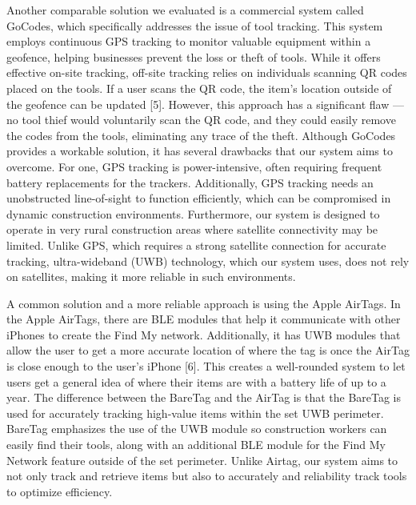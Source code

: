 \documentclass[conference]{IEEEtran}
\begin{document}
Another comparable solution we evaluated is a commercial system called 
GoCodes, which specifically addresses the issue of tool tracking. This 
system employs continuous GPS tracking to monitor valuable equipment 
within a geofence, helping businesses prevent the loss or theft of tools. 
While it offers effective on-site tracking, off-site tracking relies on 
individuals scanning QR codes placed on the tools. If a user scans the 
QR code, the item's location outside of the geofence can be updated [5]. 
However, this approach has a significant flaw — no tool thief would 
voluntarily scan the QR code, and they could easily remove the codes 
from the tools, eliminating any trace of the theft. Although GoCodes 
provides a workable solution, it has several drawbacks that our system 
aims to overcome. For one, GPS tracking is power-intensive, often requiring
frequent battery replacements for the trackers. Additionally, GPS 
tracking needs an unobstructed line-of-sight to function efficiently, 
which can be compromised in dynamic construction environments. 
Furthermore, our system is designed to operate in very rural construction 
areas where satellite connectivity may be limited. Unlike GPS, which 
requires a strong satellite connection for accurate tracking, 
ultra-wideband (UWB) technology, which our system uses, does not rely on 
satellites, making it more reliable in such environments.

A common solution and a more reliable approach is using the Apple AirTags.
In the Apple AirTags, there are BLE modules that help it communicate 
with other iPhones to create the Find My network. Additionally, it has 
UWB modules that allow the user to get a more accurate location of where 
the tag is once the AirTag is close enough to the user’s iPhone [6]. This 
creates a well-rounded system to let users get a general idea of where 
their items are with a battery life of up to a year. The difference 
between the BareTag and the AirTag is that the BareTag is used for 
accurately tracking high-value items within the set UWB perimeter. 
BareTag emphasizes the use of the UWB module so construction workers 
can easily find their tools, along with an additional BLE module for 
the Find My Network feature outside of the set perimeter. Unlike Airtag, 
our system aims to not only track and retrieve items but also to accurately 
and reliability track tools to optimize efficiency.
\end{document}
